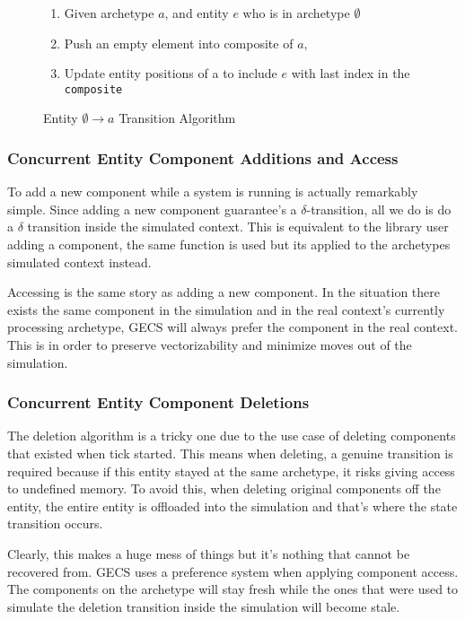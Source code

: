 \begin{figure}[H]
\begin{enumerate}
    \item Given archetype $a$, and entity $e$ who is in archetype $\emptyset$ 
    \item Push an empty element into composite of $a$,
    \item Update entity positions of a to include $e$ with last index in the \texttt{composite}
\end{enumerate}
\caption{Entity $\emptyset \rightarrow a$ Transition Algorithm}
\label{alg:empty_to_a}
\end{figure}

\subsubsection{Concurrent Entity Component Additions and Access}
To add a new component while a system is running is actually remarkably simple. Since adding a new component guarantee's a $\delta$-transition, all we do is do a $\delta$ transition inside the simulated context. This is equivalent to the library user adding a component, the same function is used but its applied to the archetypes simulated context instead. 

Accessing is the same story as adding a new component. In the situation there exists the same component in the simulation and in the real context's currently processing archetype, GECS will always prefer the component in the real context. This is in order to preserve vectorizability and minimize moves out of the simulation.

\subsubsection{Concurrent Entity Component Deletions}
The deletion algorithm is a tricky one due to the use case of deleting components that existed when tick started. This means when deleting, a genuine transition is required because if this entity stayed at the same archetype, it risks giving access to undefined memory. To avoid this, when deleting original components off the entity, the entire entity is offloaded into the simulation and that's where the state transition occurs. 

Clearly, this makes a huge mess of things but it's nothing that cannot be recovered from. GECS uses a preference system when applying component access. The components on the archetype will stay fresh while the ones that were used to simulate the deletion transition inside the simulation will become stale. 


